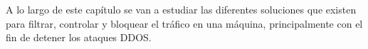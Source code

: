 A lo largo de este capítulo se van a estudiar las diferentes soluciones que existen para filtrar, controlar y bloquear el tráfico en una máquina, principalmente con el fin de detener los ataques DDOS.